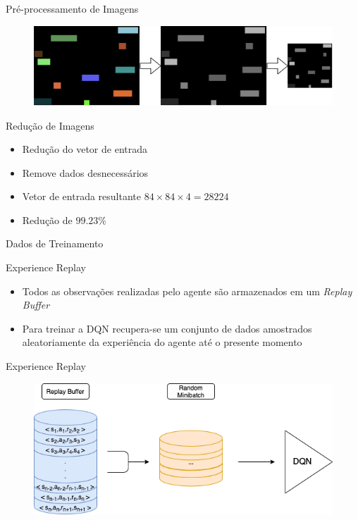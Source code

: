 \documentclass[aspectratio=169]{beamer}
\begin{document}
\begin{frame}{Pré-processamento de Imagens}
	\begin{figure}
		\centering
		\includegraphics[width=.9 \textwidth]{imgs/reducao_imgs.png}
	\end{figure}
	\begin{block}{Redução de Imagens}
		\begin{itemize}
			\item Redução do vetor de entrada 
			\item Remove dados desnecessários
			\item Vetor de entrada resultante $84\times84\times4=28224$
			\item Redução de $99.23\%$
		\end{itemize}
	\end{block}
	
\end{frame}

\begin{frame}{Dados de Treinamento}
	\begin{block}{Experience Replay}
		\begin{itemize}
			\item Todos as observações realizadas pelo agente são armazenados em um \textit{Replay Buffer}
			\item Para treinar a DQN recupera-se um conjunto de dados amostrados aleatoriamente da experiência do agente até o presente momento
		\end{itemize}
	\end{block}
\end{frame}

\begin{frame}{Experience Replay}
	\begin{figure}
		\centering
		\includegraphics[width=1 \textwidth]{imgs/experience_replay.png}
	\end{figure}
\end{frame}
\end{document}
